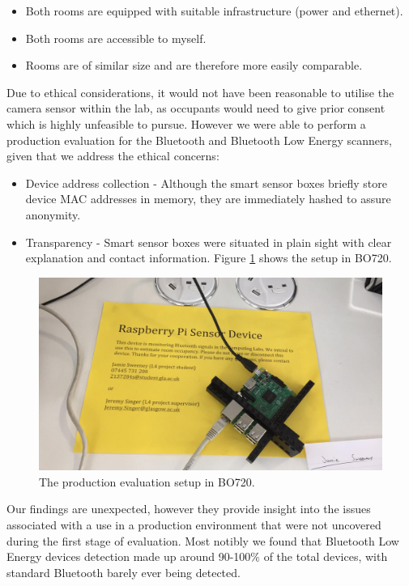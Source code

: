 \documentclass{l4proj}
\begin{document}
\begin{itemize}	
  \item Both rooms are equipped with suitable infrastructure (power and ethernet).
  \item Both rooms are accessible to myself.
  \item Rooms are of similar size and are therefore more easily comparable.
\end{itemize}

Due to ethical considerations, it would not have been reasonable to utilise the camera sensor within the lab, as occupants would need to give prior consent which is highly unfeasible to pursue. However we were able to perform a production evaluation for the Bluetooth and Bluetooth Low Energy scanners, given that we address the ethical concerns:
\begin{itemize}	
  \item Device address collection - Although the smart sensor boxes briefly store device MAC addresses in memory, they are immediately hashed to assure anonymity.
  \item Transparency - Smart sensor boxes were situated in plain sight with clear explanation and contact information. Figure \ref{fig:testrpi} shows the setup in BO720.
\end{itemize}
\begin{figure}
\centering
\includegraphics[width=\textwidth]{testrpi}
\caption{The production evaluation setup in BO720.}
\label{fig:testrpi}
\end{figure}

Our findings are unexpected, however they provide insight into the issues associated with a use in a production environment that were not uncovered during the first stage of evaluation. Most notibly we found that Bluetooth Low Energy devices detection made up around 90-100\% of the total devices, with standard Bluetooth barely ever being detected.
  
\end{document}
